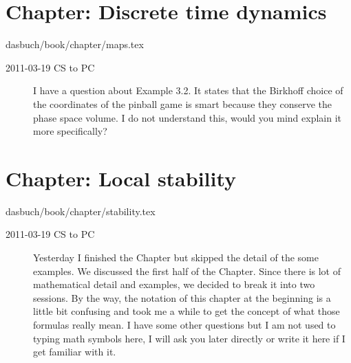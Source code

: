 \section{Chapter: Discrete time dynamics}
\label{c-maps}\noindent dasbuch/book/chapter/maps.tex
\begin{description}

\item[2011-03-19 CS to PC]
I have a question about Example 3.2. It states that
   the Birkhoff choice of the coordinates of the pinball game is smart because
   they conserve the phase space volume. I do not understand this, would
   you mind explain it more specifically?


\end{description}

\section{Chapter: Local stability}
\label{c-stability}\noindent dasbuch/book/chapter/stability.tex
\begin{description}

\item[2011-03-19 CS to PC]
Yesterday I finished the Chapter but skipped the detail of the some
examples. We discussed the first half of the Chapter. Since there is lot
of mathematical detail and examples, we decided to break it into two
sessions. By the way, the notation of this chapter at the beginning is a
little bit confusing and took me a while to get the concept of what those
formulas really mean. I have some other questions but I am not used to
typing math symbols here, I will ask you later directly or write it here
if I get familiar with it.

\end{description}

